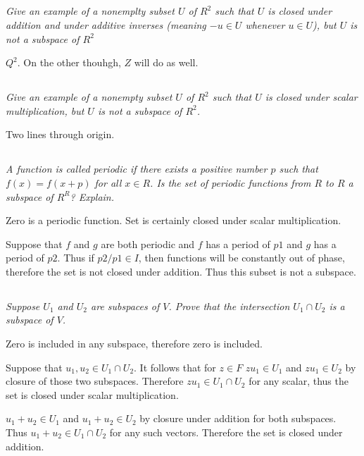 \documentclass[11pt,oneside,titlepage]{book}
\begin{document}
\subsection{}
\textit{Give an example of a nonemplty subset $U$ of $R^2$ such that $U$ is
  closed under addition and under additive inverses (meaning $-u \in U$
  whenever $u \in U$), but $U$ is not a subspace of $R^2$}

$Q^2$. On the other thouhgh, $Z$ will do as well.

\subsection{}
\textit{Give an example of a nonempty subset $U$ of $R^2$ such that $U$ is
  closed under scalar multiplication, but $U$ is not a subspace of $R^2$.}

Two lines through origin.

\subsection{}
\textit{A function is called periodic if there exists a positive number
  $p$ such that $f(x) = f(x + p)$ for all $x \in R$. Is the set of
  periodic functions from $R$ to $R$ a subspace of $R^R$? Explain. }

Zero is a periodic function. Set is
certainly closed under scalar multiplication.

Suppose that $f$ and $g$ are both periodic and $f$ has a period of $p1$
and $g$ has a period of $p2$. Thus if $p2/p1 \in I$,
then functions will be constantly out of phase, therefore the set is not
closed under addition. Thus this subset is not a subspace.

\subsection{}
\textit{Suppose $U_1$ and $U_2$ are subspaces of $V$. Prove that the
  intersection $U_1 \cap U_2$ is a subspace of $V$.}

Zero is included in any subspace, therefore zero is included.

Suppose that $u_1, u_2 \in U_1 \cap U_2$. It follows that for $z \in F$
$zu_1 \in U_1$ and $zu_1 \in U_2$ by closure of those two subspaces.
Therefore $zu_1 \in U_1 \cap U_2$ for any scalar, thus the set is
closed under scalar multiplication.

$u_1 + u_2 \in U_1$ and $u_1 + u_2 \in U_2$ by closure under addition for
both subspaces. Thus $u_1 + u_2 \in U_1 \cap U_2$ for any such vectors.
Therefore the set is closed under addition.
\end{document}
